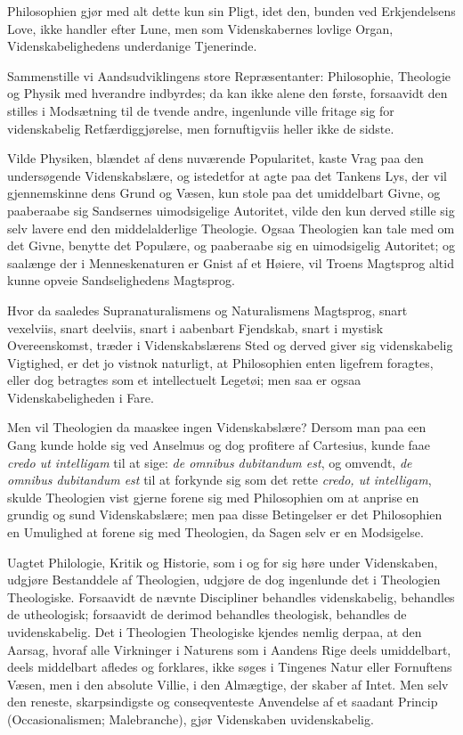 \documentclass[12pt]{book}
\newcommand{\opage}[1]{\marginnote{\footnotesize\textit{[#1]}}}
\begin{document}
Philosophien gjør med alt dette kun sin Pligt, idet den, bunden ved Erkjendelsens Love,
ikke handler efter Lune, men som Videnskabernes lovlige Organ, Videnskabelighedens
underdanige Tjenerinde.

Sammenstille vi Aandsudviklingens store Repræsentanter: Philosophie, Theologie og
Physik med hverandre indbyrdes; da kan ikke alene den første, forsaavidt den stilles i
Modsætning til de tvende andre, ingenlunde ville fritage sig for videnskabelig
Retfærdiggjørelse, men fornuftigviis heller ikke de sidste.

Vilde Physiken, blændet af dens nuværende Popularitet, kaste Vrag paa den undersøgende
Videnskabslære, og istedetfor at agte paa det Tankens Lys, der vil gjennemskinne dens
Grund og Væsen, kun stole paa det umiddelbart Givne, og paaberaabe sig Sandsernes
uimodsigelige Autoritet, vilde den kun derved stille sig selv lavere end den
middelalderlige
\opage{73} Theologie. Ogsaa Theologien kan tale med om det Givne, benytte det Populære, og
paaberaabe sig en uimodsigelig Autoritet; og saalænge der i Menneskenaturen er Gnist af
et Høiere, vil Troens Magtsprog altid kunne opveie Sandselighedens Magtsprog.

Hvor da saaledes Supranaturalismens og Naturalismens Magtsprog, snart vexelviis, snart
deelviis, snart i aabenbart Fjendskab, snart i mystisk Overeenskomst, træder i
Videnskabslærens Sted og derved giver sig videnskabelig Vigtighed, er det jo vistnok
naturligt, at Philosophien enten ligefrem foragtes, eller dog betragtes som et
intellectuelt Legetøi; men saa er ogsaa Videnskabeligheden i Fare.

Men vil Theologien da maaskee ingen Videnskabslære? Dersom man paa een Gang kunde holde
sig ved Anselmus og dog profitere af Cartesius, kunde faae \textit{credo ut intelligam}
til at sige: \textit{de omnibus dubitandum est}, og omvendt, \textit{de omnibus
dubitandum est} til at forkynde sig som det rette \textit{credo, ut intelligam}, skulde
Theologien vist gjerne forene sig med Philosophien om at anprise en grundig og sund
Videnskabslære; men paa disse Betingelser er det Philosophien en Umulighed at forene
sig med Theologien, da Sagen selv er en Modsigelse.

Uagtet Philologie, Kritik og Historie, som i og for sig høre under Videnskaben,
udgjøre Bestanddele af Theologien, udgjøre de dog ingenlunde det i Theologien
Theologiske. Forsaavidt de nævnte Discipliner behandles videnskabelig, behandles de
utheologisk; forsaavidt de derimod behandles theologisk, behandles de uvidenskabelig.
Det i Theologien Theologiske kjendes nemlig derpaa, at den Aarsag, hvoraf alle
Virkninger i Naturens som i Aandens Rige deels umiddelbart, deels middelbart afledes og
forklares, ikke søges i Tingenes Natur eller Fornuftens Væsen, men i den absolute
Villie, i den Almægtige, der skaber af Intet. Men selv den reneste, skarpsindigste og
conseqventeste Anvendelse af et
\opage{74} saadant Princip (Occasionalismen; Malebranche), gjør Videnskaben uvidenskabelig.
\end{document}
